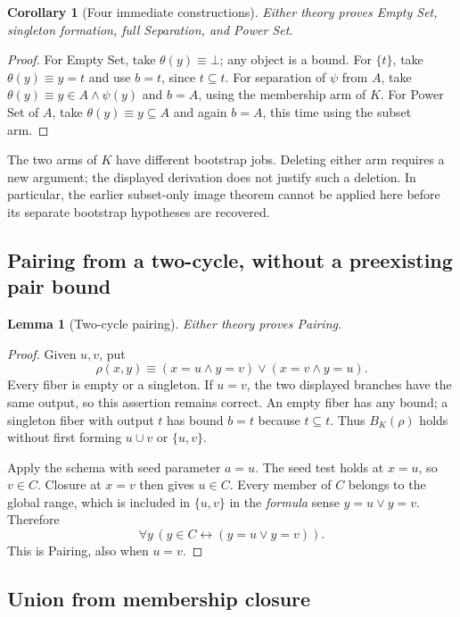 \documentclass[11pt,letterpaper]{article}
\newtheorem{lemma}[theorem]{Lemma}
\newtheorem{corollary}[theorem]{Corollary}
\theoremstyle{definition}\newtheorem{definition}[theorem]{Definition}
\theoremstyle{remark}\newtheorem{remark}[theorem]{Remark}
\begin{document}
\begin{corollary}[Four immediate constructions]\label{cor:basic}
Either theory proves Empty Set, singleton formation, full Separation,
and Power Set.
\end{corollary}
\begin{proof}
For Empty Set, take $\theta(y)\equiv\bot$; any object is a bound.
For $\{t\}$, take $\theta(y)\equiv y=t$ and use $b=t$, since
$t\subseteq t$. For separation of $\psi$ from $A$, take
$\theta(y)\equiv y\in A\land\psi(y)$ and $b=A$, using the membership
arm of $K$. For Power Set of $A$, take $\theta(y)\equiv y\subseteq A$
and again $b=A$, this time using the subset arm.
\end{proof}

The two arms of $K$ have different bootstrap jobs. Deleting either arm
requires a new argument; the displayed derivation does not justify such
a deletion. In particular, the earlier subset-only image theorem cannot
be applied here before its separate bootstrap hypotheses are recovered.

\subsection{Pairing from a two-cycle, without a preexisting pair bound}

\begin{lemma}[Two-cycle pairing]\label{lem:pair}
Either theory proves Pairing.
\end{lemma}
\begin{proof}
Given $u,v$, put
\[
 \rho(x,y)\equiv(x=u\land y=v)\lor(x=v\land y=u).
\]
Every fiber is empty or a singleton. If $u=v$, the two displayed branches
have the same output, so this assertion remains correct. An empty fiber
has any bound; a singleton fiber with output $t$ has bound $b=t$ because
$t\subseteq t$. Thus $B_K(\rho)$ holds without first forming
$u\cup v$ or $\{u,v\}$.

Apply the schema with seed parameter $a=u$. The seed test holds at $x=u$,
so $v\in C$. Closure at $x=v$ then gives $u\in C$. Every member of $C$
belongs to the global range, which is included in $\{u,v\}$ in the
\emph{formula} sense $y=u\lor y=v$. Therefore
\[
 \forall y\,(y\in C\leftrightarrow(y=u\lor y=v)).
\]
This is Pairing, also when $u=v$.
\end{proof}

\subsection{Union from membership closure}
\end{document}
